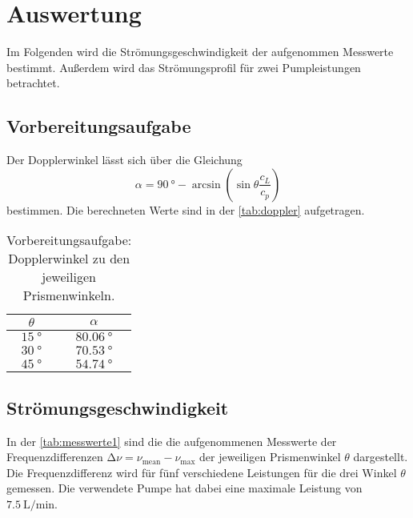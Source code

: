 \section{Auswertung}
\label{sec:auswertung}

Im Folgenden wird die Strömungsgeschwindigkeit der aufgenommen Messwerte bestimmt.
Außerdem wird das Strömungsprofil für zwei Pumpleistungen betrachtet.

\subsection{Vorbereitungsaufgabe}
\label{sec:Vorbereitungsaufgabe}

Der Dopplerwinkel lässt sich über die Gleichung 
\begin{equation*}
    \alpha = \qty{90}{°} - \arcsin\left(\sin\theta \frac{c_L}{c_p}\right)
\end{equation*}
bestimmen. Die berechneten Werte sind in der \autoref{tab:doppler} aufgetragen.

\newpage
\begin{table}[H]
    \centering
    \caption{Vorbereitungsaufgabe: Dopplerwinkel zu den jeweiligen Prismenwinkeln.}
    \label{tab:doppler}
\begin{tabular}{c c}
    \toprule
    $\theta$ & $\alpha$ \\
    \midrule
    $\qty{15}{°}$ & $\qty{80.06}{°}$ \\
    $\qty{30}{°}$ & $\qty{70.53}{°}$ \\
    $\qty{45}{°}$ & $\qty{54.74}{°}$ \\
    \bottomrule
\end{tabular}
\end{table}

\subsection{Strömungsgeschwindigkeit}
\label{sec:Strömungsgeschwindigkeit}

In der \autoref{tab:messwerte1} sind die die aufgenommenen Messwerte der Frequenzdifferenzen $ \increment \nu = \nu_{\text{mean}} - \nu_{\text{max}}$ 
der jeweiligen Prismenwinkel $\theta$ dargestellt. Die Frequenzdifferenz wird für fünf verschiedene Leistungen für die drei Winkel $\theta$ gemessen. Die 
verwendete Pumpe hat dabei eine maximale Leistung von $\SI{7.5}{\liter\per\minute}$.


